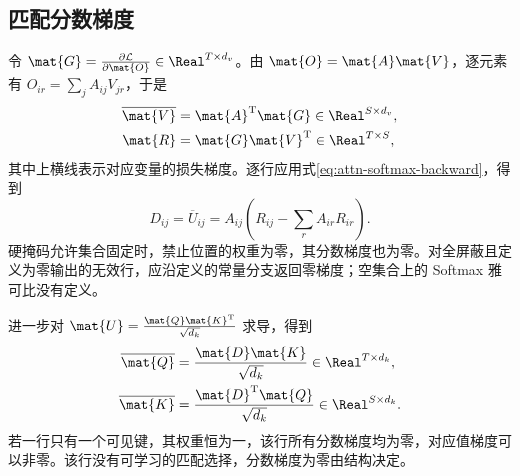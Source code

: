 \documentclass[../textbook.tex]{subfiles}
\begin{document}
\subsection{匹配分数梯度}
令 $\mat{G}=\frac{\partial\mathcal L}{\partial \mat{O}}\in\Real^{T\times d_v}$。由 $\mat{O}=\mat{A}\mat{V}$，逐元素有 $O_{ir}=\sum_j A_{ij}V_{jr}$，于是
\begin{equation}
 \begin{aligned}
  \overline{\mat{V}}&=\mat{A}^{\mathrm{T}}\mat{G}\in\Real^{S\times d_v},\\
  \mat{R}&=\mat{G}\mat{V}^{\mathrm{T}}\in\Real^{T\times S},
 \end{aligned}
\end{equation}
其中上横线表示对应变量的损失梯度。逐行应用式\eqref{eq:attn-softmax-backward}，得到
\begin{equation}
 D_{ij}=\overline U_{ij}
 =A_{ij}\left(R_{ij}-\sum_r A_{ir}R_{ir}\right).\label{eq:attn-score-gradient}
\end{equation}
硬掩码允许集合固定时，禁止位置的权重为零，其分数梯度也为零。对全屏蔽且定义为零输出的无效行，应沿定义的常量分支返回零梯度；空集合上的 Softmax 雅可比没有定义。

进一步对 $\mat{U}=\frac{\mat{Q}\mat{K}^{\mathrm{T}}}{\sqrt{d_k}}$ 求导，得到
\begin{equation}\label{eq:attn-qk-backward}
 \begin{aligned}
  \overline{\mat{Q}}&=\frac{\mat{D}\mat{K}}{\sqrt{d_k}}\in\Real^{T\times d_k},\\
  \overline{\mat{K}}&=\frac{\mat{D}^{\mathrm{T}}\mat{Q}}{\sqrt{d_k}}\in\Real^{S\times d_k}.
 \end{aligned}
\end{equation}
若一行只有一个可见键，其权重恒为一，该行所有分数梯度均为零，对应值梯度可以非零。该行没有可学习的匹配选择，分数梯度为零由结构决定。
\end{document}
